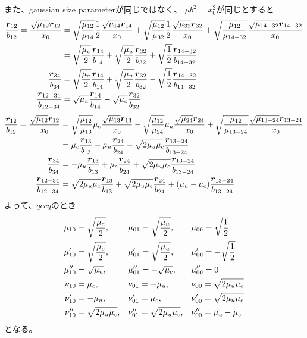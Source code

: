 \documentclass[a4j]{jarticle}
\def\cbar{\overline{{c}}}
\def\qbar{\overline{{q}}}
\newcommand{\xbld}[1]{\mbox{\boldmath $#1$}}
\def\vecr{{\xbld{r}}}
\def\half#1{\text{${#1\over 2}$}}
\begin{document}
また、gaussian size parameterが同じではなく、
$\mu b^2=x_0^2$が同じとすると
\begin{align}
{\vecr_{12}\over b_{12}}={\sqrt{\mu_{12}}\vecr_{12}\over x_0}
&=\sqrt{\mu_{12}\over \mu_{14}}{\half1}{\sqrt{\mu_{14}}\vecr_{14}\over x_0}+\sqrt{\mu_{12}\over \mu_{32}}{\half1}{\sqrt{\mu_{32}}\vecr_{32}\over x_0}
+\sqrt{\mu_{12}\over \mu_{14-32}} {\sqrt{\mu_{14-32}}\vecr_{14-32}\over x_0}
\\
&=\sqrt{\mu_c\over 2}{\vecr_{14}\over b_{14}}+\sqrt{\mu_u\over 2}{\vecr_{32}\over b_{32}}+\sqrt{\half1}{\vecr_{14-32}\over b_{14-32}}
\\
{\vecr_{34}\over b_{34}}
&=\sqrt{\mu_c\over 2}{\vecr_{14}\over b_{14}}+\sqrt{\mu_u\over 2}{\vecr_{32}\over b_{32}}-\sqrt{\half1}{\vecr_{14-32}\over b_{14-32}}
\\
{\vecr_{12-34}\over b_{12-34}}
&=\sqrt{\mu_u}{\vecr_{14}\over b_{14}}-\sqrt{\mu_c}{\vecr_{32}\over b_{32}}
\end{align}
\begin{align}
{\vecr_{12}\over b_{12}}={\sqrt{\mu_{12}}\vecr_{12}\over x_0}
&=\sqrt{\mu_{12}\over \mu_{13}}\mu_c{\sqrt{\mu_{13}}\vecr_{13}\over x_0}-\sqrt{\mu_{12}\over \mu_{24}}\mu_u{\sqrt{\mu_{24}}\vecr_{24}\over x_0}
+\sqrt{\mu_{12}\over \mu_{13-24}} {\sqrt{\mu_{13-24}}\vecr_{13-24}\over x_0}
\\
&=\mu_c{\vecr_{13}\over b_{13}}-\mu_u{\vecr_{24}\over b_{24}}+\sqrt{2\mu_u\mu_c}{\vecr_{13-24}\over b_{13-24}}
\\
{\vecr_{34}\over b_{34}}
&=-\mu_u{\vecr_{13}\over b_{13}}+\mu_c{\vecr_{24}\over b_{24}}+\sqrt{2\mu_u\mu_c}{\vecr_{13-24}\over b_{13-24}}
\\
{\vecr_{12-34}\over b_{12-34}}
&=\sqrt{2\mu_u\mu_c}{\vecr_{13}\over b_{13}}+\sqrt{2\mu_u\mu_c}{\vecr_{24}\over b_{24}}+(\mu_u-\mu_c){\vecr_{13-24}\over b_{13-24}}
\end{align}
よって、$q\cbar c\qbar$のとき
\begin{align}
\mu_{10}&=\sqrt{\mu_c\over 2}, && \mu_{01}=\sqrt{\mu_u\over 2}, &&\mu_{00}=\sqrt{\half1}
\\
\mu'_{10}&=\sqrt{\mu_c\over 2}, && \mu'_{01}=\sqrt{\mu_u\over 2}, &&\mu'_{00}=-\sqrt{\half1}
\\
\mu''_{10}&=\sqrt{\mu_u}, && \mu''_{01}=-\sqrt{\mu_c}, &&\mu''_{00}=0
\\
\nu_{10}&=\mu_c, && \nu_{01}=-\mu_u, &&\nu_{00}=\sqrt{2\mu_u\mu_c}
\\
\nu'_{10}&=-\mu_u, && \nu'_{01}=\mu_c, &&\nu'_{00}=\sqrt{2\mu_u\mu_c}
\\
\nu''_{10}&=\sqrt{2\mu_u\mu_c}, && \nu''_{01}=\sqrt{2\mu_u\mu_c}, &&\nu''_{00}=\mu_u-\mu_c
\end{align}
となる。
\end{document}
